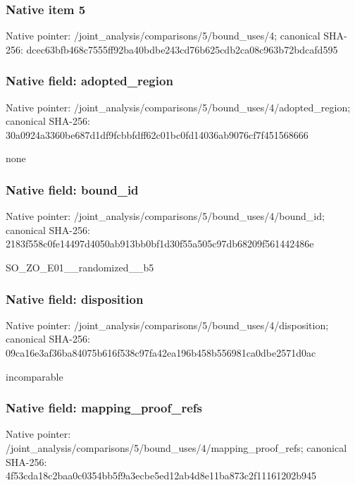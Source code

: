 \documentclass[10pt,a4paper]{article}
\begin{document}
\subsubsection{Native item 5}
Native pointer: /joint\_\allowbreak{}analysis/comparisons/5/bound\_\allowbreak{}uses/4; canonical SHA-256: dcec63bfb468c7555ff92ba40bdbe243cd76b625cdb2ca08c963b72bdcafd595

\subsubsection{Native field: adopted\_\allowbreak{}region}
Native pointer: /joint\_\allowbreak{}analysis/comparisons/5/bound\_\allowbreak{}uses/4/adopted\_\allowbreak{}region; canonical SHA-256: 30a0924a3360be687d1df9fcbbfdff62c01bc0fd14036ab9076cf7f451568666

\begingroup\raggedright\sloppy none\par\endgroup

\subsubsection{Native field: bound\_\allowbreak{}id}
Native pointer: /joint\_\allowbreak{}analysis/comparisons/5/bound\_\allowbreak{}uses/4/bound\_\allowbreak{}id; canonical SHA-256: 2183f558c0fe14497d4050ab913bb0bf1d30f55a505c97db68209f561442486e

\begingroup\raggedright\sloppy SO\_\allowbreak{}ZO\_\allowbreak{}E01\_\allowbreak{}\_\allowbreak{}randomized\_\allowbreak{}\_\allowbreak{}b5\par\endgroup

\subsubsection{Native field: disposition}
Native pointer: /joint\_\allowbreak{}analysis/comparisons/5/bound\_\allowbreak{}uses/4/disposition; canonical SHA-256: 09ca16e3af36ba84075b616f538c97fa42ea196b458b556981ca0dbe2571d0ac

\begingroup\raggedright\sloppy incomparable\par\endgroup

\subsubsection{Native field: mapping\_\allowbreak{}proof\_\allowbreak{}refs}
Native pointer: /joint\_\allowbreak{}analysis/comparisons/5/bound\_\allowbreak{}uses/4/mapping\_\allowbreak{}proof\_\allowbreak{}refs; canonical SHA-256: 4f53cda18c2baa0c0354bb5f9a3ecbe5ed12ab4d8e11ba873c2f11161202b945
\end{document}
